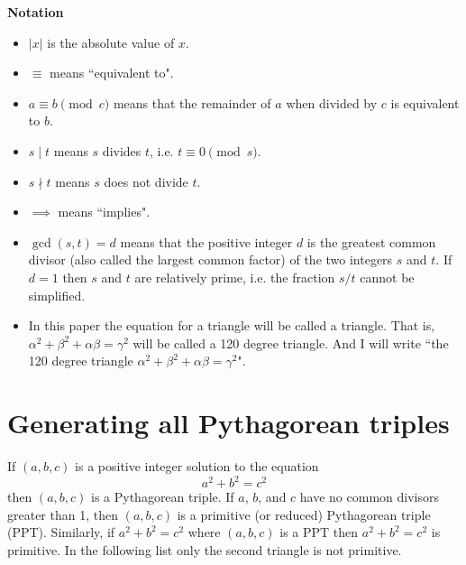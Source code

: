 \documentclass{article}
\theoremstyle{definition}
\begin{document}
\begin{titlepage}
\bigskip

\noindent\textbf{Notation}
\begin{itemize}
\item \(|x|\) is the absolute value of \(x\).
\item \(\equiv\) means ``equivalent to".
\item \(a \equiv b \pmod{c}\) means that the remainder of \(a\) when divided by \(c\) is equivalent to \(b\).
\item \(s\mid t\) means \(s\) divides \(t\), i.e. \(t \equiv 0 \pmod{s}\).
\item \(s\nmid t\) means \(s\) does not divide \(t\).
\item \(\implies\) means ``implies".
\item \(\gcd (s,t)=d\) means that the positive integer \(d\) is the greatest common divisor (also called the largest common factor) of the two integers \(s\) and \(t\). If \(d=1\) then \(s\) and \(t\) are relatively prime, i.e. the fraction \(s/t\) cannot be simplified.
\item In this paper the equation for a triangle will be called a triangle. That is, \(\alpha^2+\beta^2+\alpha \beta=\gamma^2\) will be called a 120 degree triangle. And I will write ``the 120 degree triangle \(\alpha^2+\beta^2+\alpha \beta=\gamma^2\)".

\end{itemize}

\end{titlepage}

\clearpage
{}

\section{Generating all Pythagorean triples}
\label{sec:GenPT}

\begin{center}
\end{center}

If \((a,b,c)\) is a positive integer solution to the equation
\begin{equation}
a^2 + b^2 = c^2
\end{equation}
then \((a,b,c)\) is a Pythagorean triple. If \(a\), \(b\), and \(c\) have no common divisors greater than 1, then \((a,b,c)\) is a primitive (or reduced) Pythagorean triple (PPT). Similarly, if \(a^2 + b^2 = c^2\) where \((a,b,c)\) is a PPT then  \(a^2 + b^2 = c^2\) is primitive. In the following list only the second triangle is not primitive.
\end{document}
